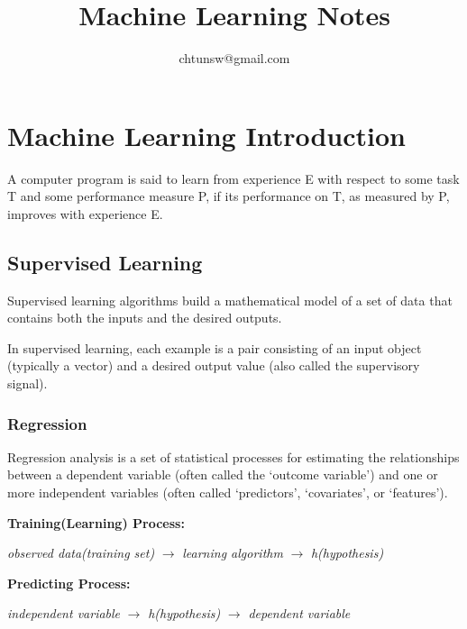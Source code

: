 \documentclass{article}
\title{Machine Learning Notes}
\author{chtunsw@gmail.com}
\date{}
\begin{document}
\maketitle

\clearpage

\tableofcontents{}

\clearpage

\section{Machine Learning Introduction}

A computer program is said to learn
from experience E with respect to some task T
and some performance measure P, if its
performance on T, as measured by P, improves
with experience E. 

\subsection{Supervised Learning}

Supervised learning algorithms build a mathematical model 
of a set of data that contains both the inputs and the desired 
outputs.

\bigskip

\noindent In supervised learning, each example is a 
pair consisting of an input object (typically a vector) 
and a desired output value (also called the supervisory signal).

\subsubsection{Regression}

Regression analysis is a set of statistical processes 
for estimating the relationships between a dependent 
variable (often called the `outcome variable') and one 
or more independent variables (often called `predictors', 
`covariates', or `features').

\bigskip

\noindent \textbf{Training(Learning) Process:}

\noindent \textit{observed data(training set)} $\rightarrow$ \textit{learning algorithm} $\rightarrow$ \textit{h(hypothesis)}

\bigskip

\noindent \textbf{Predicting Process:}

\noindent \textit{independent variable} $\rightarrow$ \textit{h(hypothesis)} $\rightarrow$ \textit{dependent variable}
\end{document}

